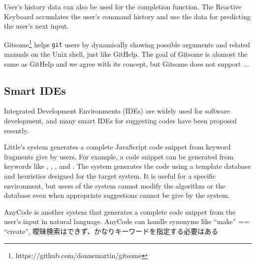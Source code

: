 \documentclass{sigchi}
\def\GH{\textsf{GitHelp}}
\def\GIT{\texttt{git}}
\begin{document}
User's history data can also be used for the completion function.
The Reactive Keyboard\cite{ReactiveKeyboard}
accumlates the user's command history and use the data
for predicting the user's next input.

Gitsome\footnote{\textsf{https:{\slash}{\slash}github.com{\slash}donnemartin{\slash}gitsome}}
helps {\GIT} users by
dynamically showing possible arguments and related manuals on the Unix shell,
just like {\GH}.
The goal of Gitsome is alomost the same as {\GH} and we agree with its concept,
but Gitsome does not support ...

\subsection{Smart IDEs}

Integrated Development Environments (IDEs) are widely used for
software development, and
many smart IDEs for suggesting codes have been proposed resently.

Little's system\cite{Little:2006:TKC:1166253.1166275}
generates a complete JavaScript code snippet from keyword fragments
give by users.
For example, a code snippet
can be generated from keywords like
,
,
,
and .
The system generates the code using a template database and heuristics
designed for the target system.
It is useful for a specific environment, but
users of the system cannot modify the algorithm or the database
even when appropriate suggestions cannot be give by the system.


AnyCode\cite{Gvero:2015:SJE:2814270.2814295} is another system
that generates a complete code snippet from the user's
input in natural language.
AnyCode can handle synonyms like ``make'' == ``create'',
曖昧検索はできず、かなりキーワードを指定する必要はある

\end{document}
